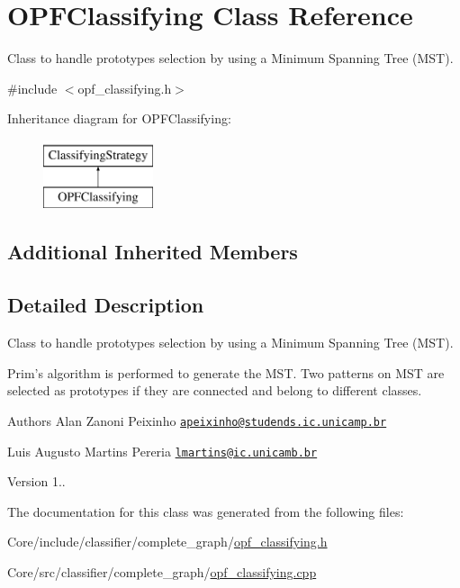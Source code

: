\hypertarget{classOPFClassifying}{\section{O\+P\+F\+Classifying Class Reference}
\label{classOPFClassifying}
}


Class to handle prototypes selection by using a Minimum Spanning Tree (M\+S\+T).  




{\ttfamily \#include $<$opf\+\_\+classifying.\+h$>$}

Inheritance diagram for O\+P\+F\+Classifying\+:\begin{figure}[H]
\begin{center}
\leavevmode
\includegraphics[height=2.000000cm]{classOPFClassifying}
\end{center}
\end{figure}
\subsection*{Additional Inherited Members}


\subsection{Detailed Description}
Class to handle prototypes selection by using a Minimum Spanning Tree (M\+S\+T). 

Prim's algorithm is performed to generate the M\+S\+T. Two patterns on M\+S\+T are selected as prototypes if they are connected and belong to different classes.

\begin{DoxyAuthor}{Authors}
Alan Zanoni Peixinho \href{mailto:apeixinho@studends.ic.unicamp.br}{\tt apeixinho@studends.\+ic.\+unicamp.\+br} 

Luis Augusto Martins Pereria \href{mailto:lmartins@ic.unicamb.br}{\tt lmartins@ic.\+unicamb.\+br} 
\end{DoxyAuthor}
\begin{DoxyVersion}{Version}
1.. 
\end{DoxyVersion}


The documentation for this class was generated from the following files\+:\begin{DoxyCompactItemize}
\item 
Core/include/classifier/complete\+\_\+graph/\hyperlink{opf__classifying_8h}{opf\+\_\+classifying.\+h}\item 
Core/src/classifier/complete\+\_\+graph/\hyperlink{opf__classifying_8cpp}{opf\+\_\+classifying.\+cpp}\end{DoxyCompactItemize}
